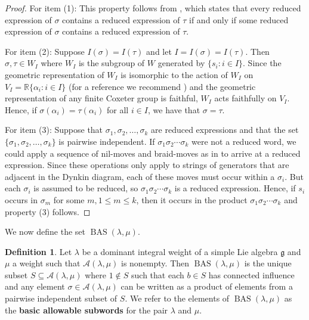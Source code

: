 \documentclass{amsart}
\theoremstyle{definition}
\newtheorem{definition}[theorem]{Definition}
\DeclareMathOperator{\BAS}{BAS}
\newcommand{\calA}{\mathcal{A}}
\newcommand{\defn}[1]{\textbf{#1}}
\begin{document}
\begin{proof} For item (1): This property follows from \cite[Corollary 2.2.3]{bjorner2005combinatorics}, which states that every reduced expression of $\sigma$ contains a reduced expression of $\tau$ if and only if some reduced expression of $\sigma$ contains a reduced expression of $\tau$.

    
    For item (2): Suppose $I(\sigma)=I(\tau)$ and let $I=I(\sigma)=I(\tau)$. Then $\sigma,\tau\in W_I$ where $W_I$ is the subgroup of $W$ generated by $\{s_i:i\in I\}$. Since the geometric representation of $W_I$ is isomorphic to the action of $W_I$ on $V_I=\mathbb{R}\{\alpha_i:i\in I\}$ (for a reference we recommend \cite[Section 5.5]{humphreys1990reflection}) and the geometric representation of any finite Coxeter group is faithful, $W_I$ acts faithfully on $V_I$. 
    Hence, if $\sigma(\alpha_i)=\tau(\alpha_i)$ for all $i\in I$, we have that $\sigma=\tau$.

    For item (3): Suppose that $\sigma_1,\sigma_2,\ldots,\sigma_k$ are reduced expressions and that the set $\{\sigma_1, \sigma_2,\ldots,\sigma_k\}$ is pairwise independent. 
    If $\sigma_1\sigma_2\cdots\sigma_k$ were not a reduced word, we could apply a sequence of nil-moves and braid-moves as in \cite[Theorem 3.3.1]{bjorner2005combinatorics} to arrive at a reduced expression. Since these operations only apply to strings of generators that are adjacent in the Dynkin diagram, each of these moves must occur within a $\sigma_i$. 
    But each $\sigma_i$ is assumed to be reduced, so $\sigma_1\sigma_2\cdots\sigma_k$ is a reduced expression. 
    Hence, if $s_i$ occurs in $\sigma_m$ for some $m, 1 \le m \le k$, then it occurs in the product $\sigma_1\sigma_2\cdots\sigma_k$ and property (3) follows.
\end{proof}

We now define the set $\BAS(\lambda,\mu)$.

\begin{definition}
    Let $\lambda$ be a dominant integral weight of a simple Lie algebra $\mathfrak{g}$ and $\mu$ a weight such that $\calA(\lambda,\mu)$ is nonempty. 
    Then $\BAS(\lambda,\mu)$ is the unique subset $S\subseteq \calA(\lambda,\mu)$ where $1\notin S$ such that each $b\in S$ has connected influence and any element $\sigma\in \calA(\lambda,\mu)$ can be written as a product of elements from a pairwise independent subset of $S$. 
    We refer to the elements of $\BAS(\lambda,\mu)$ as the \defn{basic allowable subwords} for the pair $\lambda$ and $\mu$.
\end{definition}
\end{document}
